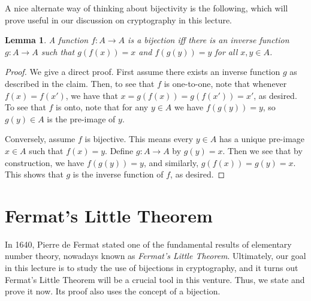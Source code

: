\documentclass[11pt]{article}
\newcounter{thm}
\newtheorem{lemma}{Lemma}[thm]
\begin{document}
A nice alternate way of thinking about bijectivity is the following, which will prove useful in our discussion on cryptography in this lecture.

\begin{lemma}\label{l:inverse}
A function $f: A\rightarrow A$ is a bijection iff there is an {\it inverse\/} function $g: A\rightarrow A$ such that $g(f(x)) = x$ and $f(g(y)) = y$ for all $x,y \in A$.
\end{lemma}
\begin{proof}
We give a direct proof. First assume there exists an inverse function $g$ as described in the claim. Then, to see that $f$ is one-to-one, note that whenever $f(x) = f(x')$, we have that $x = g(f(x)) = g(f(x')) = x'$, as desired. To see that $f$ is onto, note that for any $y \in A$ we have $f(g(y)) = y$, so $g(y) \in A$ is the pre-image of $y$.

Conversely, assume $f$ is bijective. This means every $y \in A$ has a unique pre-image $x \in A$ such that $f(x) = y$. Define $g \colon A \to A$ by $g(y) = x$. Then we see that by construction, we have $f(g(y)) = y$, and similarly, $g(f(x)) = g(y) = x$. This shows that $g$ is the inverse function of $f$, as desired.
\end{proof}

\pagebreak
{}


\section{Fermat's Little Theorem}

In 1640, Pierre de Fermat stated one of the fundamental results of elementary number theory, nowadays known as \emph{Fermat's Little Theorem}. Ultimately, our goal in this lecture is to study the use of bijections in cryptography, and it turns out Fermat's Little Theorem will be a crucial tool in this venture. Thus, we state and prove it now. Its proof also uses the concept of a bijection.
\end{document}
